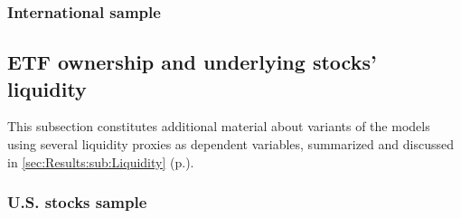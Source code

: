 \subsubsection{International sample}
\begin{landscape}
  {\linespread{1.0}
    \begin{table}
      
    \end{table}
    \begin{table}
      
    \end{table}
    \begin{table}
      
    \end{table}
    \begin{table}
      
    \end{table}
  }
\end{landscape}

\subsection{ETF ownership and underlying stocks' liquidity}
\label{app:sec:DetailedResults:Liquidity}
This subsection constitutes additional material about variants of the models using several liquidity proxies as dependent variables, summarized and discussed in \autoref{sec:Results:sub:Liquidity} (p.\pageref{sec:Results:sub:Liquidity}).
\subsubsection{U.S. stocks sample}
\begin{landscape}
  {\linespread{1.0}
    \begin{table}
      
    \end{table}
    \begin{table}
      
    \end{table}
    \begin{table}
      
    \end{table}
    \begin{table}
      
    \end{table}
  }
\end{landscape}

